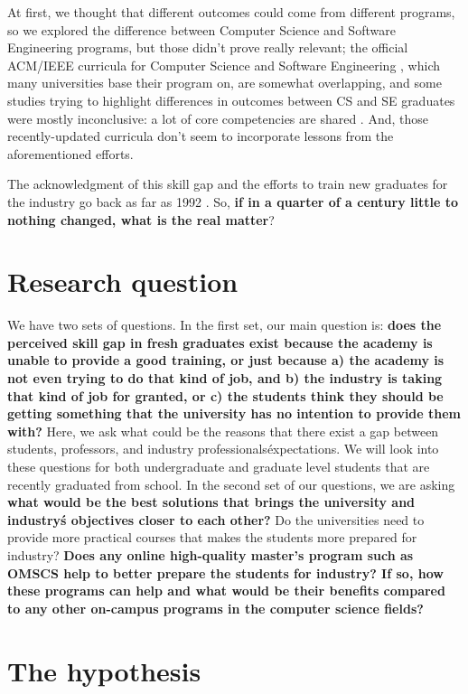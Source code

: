 \documentclass{sigchi}
\begin{document}
At first, we thought that different outcomes could come from different programs, so we explored the difference between Computer Science and Software Engineering programs, but those didn't prove really relevant; the official ACM/IEEE curricula for Computer Science \cite{Force2013} and Software Engineering \cite{Ardis2015}, which many universities base their program on, are somewhat overlapping, and some studies trying to highlight differences in outcomes between CS and SE graduates were mostly inconclusive: a lot of core competencies are shared \cite{Meziane2004} \cite{Rasool2014}. And, those recently-updated curricula don't seem to incorporate lessons from the aforementioned efforts.

The acknowledgment of this skill gap and the efforts to train new graduates for the industry go back as far as 1992 \cite{Dawson1992}. So, \textbf{if in a quarter of a century little to nothing changed, what is the real matter}?

\section{Research question}
We have two sets of questions. In the first set, our main question is: \textbf{does the perceived skill gap in fresh graduates exist because the academy is unable to provide a good training, or just because a) the academy is not even trying to do that kind of job, and b) the industry is taking that kind of job for granted, or c) the students think they should be getting something that the university has no intention to provide them with?} Here, we ask what could be the reasons that there exist a gap between students, professors, and industry professionals\' expectations. We will look into these questions for both undergraduate and graduate level students that are recently graduated from school.\newline
In the second set of our questions, we are asking \textbf{what would be the best solutions that brings the university and industry\'s objectives closer to each other?} Do the universities need to provide more practical courses that makes the students more prepared for industry? \textbf{Does any online high-quality master's program such as OMSCS help to better prepare the students for industry? If so, how these programs can help and what would be their benefits compared to any other on-campus programs in the computer science fields?}
\section{The hypothesis}
\end{document}
